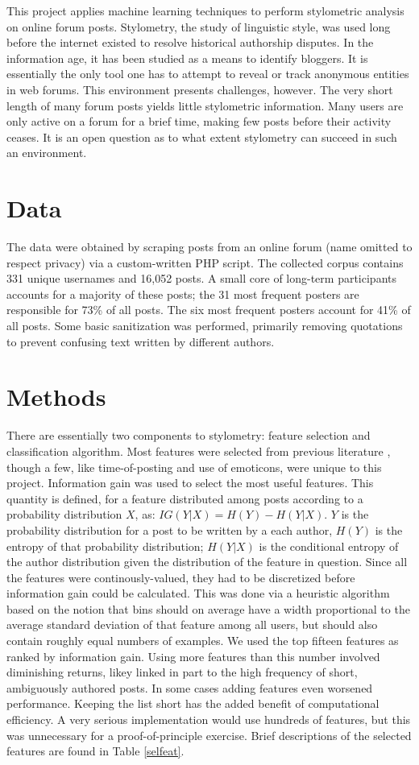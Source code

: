 \documentclass[12pt,letterpaper,onecolumn,oneside]{article}
\numberwithin{equation}{section}
\numberwithin{figure}{section}
\begin{document}
This project applies machine learning techniques to perform stylometric analysis on online forum posts. Stylometry, the study of linguistic style, was used long before the internet existed to resolve historical 
authorship disputes. In the information age, it has been studied as a means to identify bloggers. It is essentially the only tool one has to attempt to reveal or track anonymous entities in web forums. This 
environment presents challenges, however. The very short length of many forum posts yields little stylometric information. Many users are only active on a forum for a brief time, making few posts before their 
activity ceases. It is an open question as to what extent stylometry can succeed in such an environment.

\section{Data}
The data were obtained by scraping posts from an online forum (name omitted to respect privacy) via a custom-written PHP script. The collected corpus contains 331 unique usernames and 16,052 posts. A small core of 
long-term participants accounts for a majority of these posts; the 31 most frequent posters are responsible for 73\% of all posts. The six most frequent posters account for 41\% of all posts. Some basic 
sanitization was performed, primarily removing quotations to prevent confusing text written by different authors.

\section{Methods}
There are essentially two components to stylometry: feature selection and classification algorithm. Most features were selected from previous literature \cite{anonymouth,stanford}, though a few, like 
time-of-posting and use of emoticons, were unique to this project. Information gain was used to select the most useful features. This quantity is defined, for a feature distributed among posts according to a 
probability distribution \(X\), as: \(IG(Y|X) = H(Y) - H(Y|X)\). \(Y\) is the probability distribution for a post to be written by a each author, \(H(Y)\) is the entropy of that probability distribution; \(H(Y|X)\) is 
the conditional entropy of the author distribution given the distribution of the feature in question. Since all the features were continously-valued, they had to be discretized before information gain could be 
calculated. This was done via a heuristic algorithm based on the notion that bins should on average have a width proportional to the average standard deviation of that feature among all users, but should also contain 
roughly equal numbers of examples. We used the top fifteen features as ranked by information gain. Using more features than this number involved diminishing returns, likey linked in part to the high frequency of short, 
ambiguously authored posts. In some cases adding features even worsened performance. Keeping the list short has the added benefit of computational efficiency. A very serious implementation would use hundreds of 
features, but this was unnecessary for a proof-of-principle exercise. Brief descriptions of the selected features are found in Table \ref{selfeat}.
\end{document}

